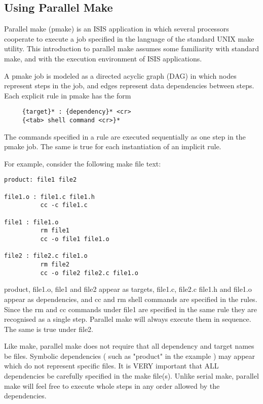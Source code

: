 \subsection*{Using Parallel Make}
 
Parallel make (pmake) is an ISIS application in which several processors
cooperate to execute a job specified in the language of the standard UNIX make
utility.  This introduction to parallel make assumes some familiarity with
standard make, and with the execution environment of ISIS applications.
 
A pmake job is modeled as a directed acyclic graph (DAG) in which nodes
represent steps in the job, and edges represent data dependencies between
steps.  Each explicit rule in pmake has the form

\begin{verbatim}
     {target}* : {dependency}* <cr>
     {<tab> shell command <cr>}*
\end{verbatim}

The commands specified in a rule are executed sequentially as one step in the
pmake job.  The same is true for each instantiation of an implicit rule.
 
For example, consider the following make file text:

\begin{verbatim}
product: file1 file2
 
file1.o : file1.c file1.h
          cc -c file1.c
 
file1 : file1.o
          rm file1
          cc -o file1 file1.o
 
file2 : file2.c file1.o
          rm file2
          cc -o file2 file2.c file1.o
\end{verbatim}
 
product, file1.o, file1 and file2 appear as targets, file1.c, file2.c file1.h
and file1.o appear as dependencies, and cc and rm shell commands are specified
in the rules.  Since the rm and cc commands under file1 are specified in the
same rule they are recognised as a single step.  Parallel make will always
execute them in sequence. The same is true under file2.
 
Like make, parallel make does not require that all dependency and target names
be files.  Symbolic dependencies ( such as "product" in the example ) may
appear which do not represent specific files.  It is VERY important that ALL
dependencies be carefully specified in the make file(s).  Unlike serial make,
parallel make will feel free to execute whole steps in any order allowed by the
dependencies.
 
